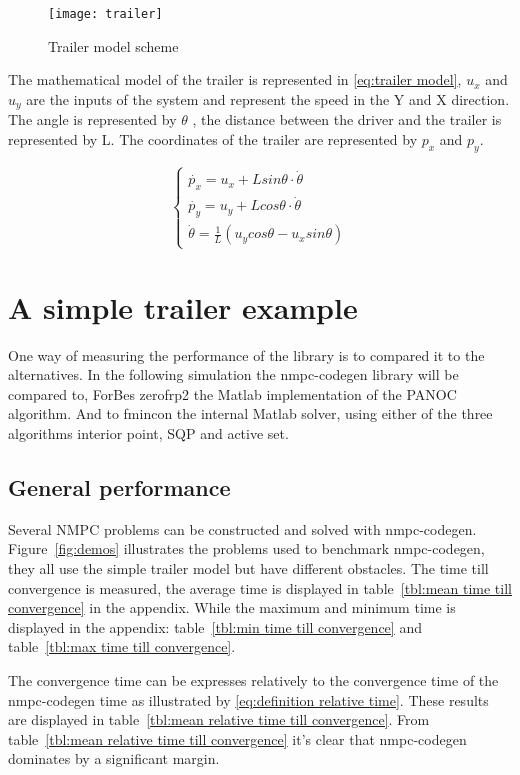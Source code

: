 \begin{figure}
	\centering
	\texttt{[image: trailer]}
	\caption{Trailer model scheme}
	\label{fig:trailer model}
\end{figure}

The mathematical model of the trailer is represented in \eqref{eq:trailer model}, $u_x$ and $u_y$ are the inputs of the system and represent the speed in the Y and X direction. The angle is represented by $\theta$ , the distance between the driver and the trailer is represented by L. The coordinates of the trailer are represented by $p_x$ and $p_y$.

\begin{equation}
	\begin{cases}
		\dot{p_x} = u_x + L sin \theta \cdot \dot{\theta} \\
		\dot{p_y} = u_y + L cos \theta \cdot \dot{\theta} \\
		\dot{\theta} = \frac{1}{L}(u_ycos \theta - u_x sin \theta)	
	\end{cases}
	\label{eq:trailer model}
\end{equation}

\section{A simple trailer example}
One way of measuring the performance of the library is to compared it to the alternatives. In the following simulation the nmpc-codegen library will be compared to, ForBes zerofrp2 the Matlab implementation of the PANOC algorithm. And to fmincon the internal Matlab solver, using either of the three algorithms interior point, SQP and active set.

\subsection{General performance}
Several NMPC problems can be constructed and solved with nmpc-codegen. Figure~\ref{fig:demos} illustrates the problems used to benchmark nmpc-codegen, they all use the simple trailer model but have different obstacles. The time till convergence is measured, the average time is displayed in table~\ref{tbl:mean time till convergence} in the appendix. While the maximum and minimum time is displayed in the appendix: table~\ref{tbl:min time till convergence} and table~\ref{tbl:max time till convergence}.

The convergence time can be expresses relatively to the convergence time of the nmpc-codegen time as illustrated by \eqref{eq:definition relative time}. These results are displayed in table~\ref{tbl:mean relative time till convergence}. From table~\ref{tbl:mean relative time till convergence} it's clear that nmpc-codegen dominates by a significant margin.

